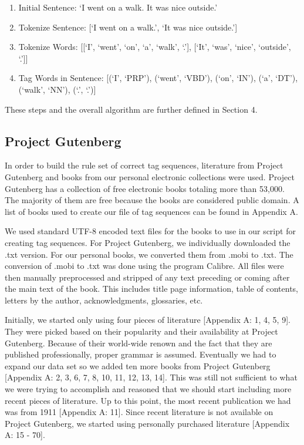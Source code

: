 \documentclass[11pt,a4paper]{article}
\begin{document}
\begin{multicols}{2}
\begin{enumerate}
   \item Initial Sentence: `I went on a walk. It was nice outside.'
   \item Tokenize Sentence: [`I went on a walk.', `It was nice outside.']
   \item Tokenize Words: [[`I', `went', `on', `a', `walk', `.'], [`It', `was', `nice', `outside', `.']]
   \item Tag Words in Sentence: [(`I', `PRP'), (`went', `VBD'), (`on', `IN'), (`a', `DT'), (`walk', `NN'), (`.', `.')]
\end{enumerate}

These steps and the overall algorithm are further defined in Section 4.

\subsection{Project Gutenberg}
In order to build the rule set of correct tag sequences, literature from Project Gutenberg \cite{gutenberg} and books from our personal electronic collections were used. Project Gutenberg has a collection of free electronic books totaling more than 53,000. The majority of them are free because the books are considered public domain. A list of books used to create our file of tag sequences can be found in Appendix A. 

We used standard UTF-8 encoded text files for the books to use in our script for creating tag sequences. For Project Gutenberg, we individually downloaded the .txt version.  For our personal books, we converted them from .mobi to .txt. The conversion of .mobi to .txt was done using the program Calibre. All files were then manually preprocessed and stripped of any text preceding or coming after the main text of the book. This includes title page information, table of contents, letters by the author, acknowledgments, glossaries, etc.

Initially, we started only using four pieces of literature [Appendix A: 1, 4, 5, 9]. They were picked based on their popularity and their availability at Project Gutenberg. Because of their world-wide renown and the fact that they are published professionally,  proper grammar is assumed. Eventually we had to expand our data set so we added ten more books from Project Gutenberg [Appendix A: 2, 3, 6, 7, 8, 10, 11, 12, 13, 14]. This was still not sufficient to what we were trying to accomplish and reasoned that we should start including more recent pieces of literature. Up to this point, the most recent publication we had was from 1911 [Appendix A: 11]. Since recent literature is not available on Project Gutenberg, we started using personally purchased literature [Appendix A: 15 - 70].


\end{multicols}
\end{document}
